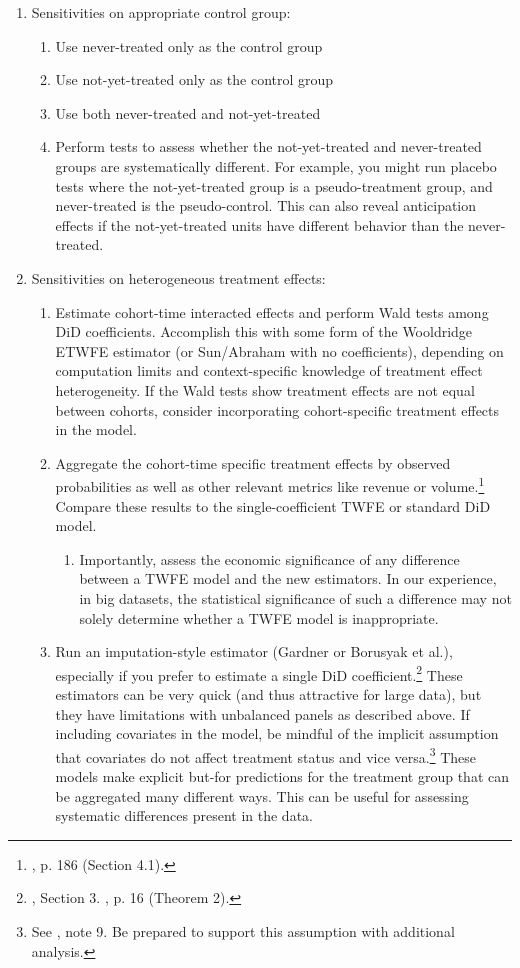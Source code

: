 \documentclass[12pt]{article}
\begin{document}
\begin{enumerate}
    \item Sensitivities on appropriate control group:
    \begin{enumerate}
        \item Use never-treated only as the control group
        \item Use not-yet-treated only as the control group
        \item Use both never-treated and not-yet-treated
        \item Perform tests to assess whether the not-yet-treated and never-treated groups are systematically different. For example, you might run placebo tests where the not-yet-treated group is a pseudo-treatment group, and never-treated is the pseudo-control. This can also reveal anticipation effects if the not-yet-treated units have different behavior than the never-treated.
    \end{enumerate}
    \item Sensitivities on heterogeneous treatment effects:
    \begin{enumerate}
        \item Estimate cohort-time interacted effects and perform Wald tests among DiD coefficients. Accomplish this with some form of the Wooldridge ETWFE estimator (or Sun/Abraham with no coefficients), depending on computation limits and context-specific knowledge of treatment effect heterogeneity. If the Wald tests show treatment effects are not equal between cohorts, consider incorporating cohort-specific treatment effects in the model.
        \item Aggregate the cohort-time specific treatment effects by observed probabilities  as well as other relevant metrics like revenue or volume.\footnote{\citet{sunabr2021a}, p. 186 (Section 4.1).}  Compare these results to the single-coefficient TWFE or standard DiD model.
        \begin{enumerate}
            \item Importantly, assess the economic significance of any difference between a TWFE model and the new estimators. In our experience, in big datasets, the statistical significance of such a difference may not solely determine whether a TWFE model is inappropriate.
        \end{enumerate}
        \item Run an imputation-style estimator (Gardner or Borusyak et al.), especially if you prefer to estimate a single DiD coefficient.\footnote{\citet{gardner2022a}, Section 3. \citet{borusyak2024revisiting}, p. 16 (Theorem 2).}  These estimators can be very quick (and thus attractive for large data), but they have limitations with unbalanced panels as described above. If including covariates in the model, be mindful of the implicit assumption that covariates do not affect treatment status and vice versa.\footnote{See \citet{gardner2022a}, note 9. Be prepared to support this assumption with additional analysis.}  These models make explicit but-for predictions for the treatment group that can be aggregated many different ways. This can be useful for assessing systematic differences present in the data.

\end{enumerate}
\end{enumerate}
\end{document}
